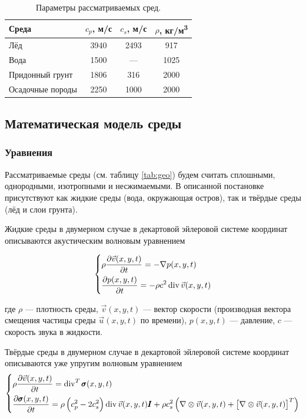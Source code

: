 \renewcommand{\arraystretch}{1.2}
\begin{table}[htb]
\centering
    \begin{tabular}{|l|c|c|c|}
    \hline
    Среда & $c_p$, м/с & $c_s$, м/с & $\rho$, кг/м\textsuperscript{3} \\ \hline
    Лёд & 3940 & 2493 & 917 \\ \hline
    Вода & 1500  & --- & 1025 \\ \hline
    Придонный грунт & 1806 & 316 & 2000 \\ \hline
    Осадочные породы & 2250 & 1000 & 2000 \\ \hline
    \end{tabular}
\caption{Параметры рассматриваемых сред.}
\label{tab:geo}
\end{table}
\renewcommand{\arraystretch}{1.0}

\subsection{Математическая модель среды}

\subsubsection{Уравнения}

Рассматриваемые среды (см. таблицу \autoref{tab:geo}) будем считать сплошными, однородными, изотропными и несжимаемыми. В описанной постановке присутствуют как жидкие среды (вода, окружающая остров), так и твёрдые среды (лёд и слои грунта).

Жидкие среды в двумерном случае в декартовой эйлеровой системе координат описываются акустическим волновым уравнением

\begin{equation}
    \begin{dcases}
        \rho \frac{\partial \vec{v}(x,y,t)}{\partial t} = -\nabla p (x,y,t) \\
        \frac{\partial p(x,y,t)}{\partial t} = -\rho c^2 \operatorname{div} \vec{v}(x,y,t)
    \end{dcases}
    \label{eq:acoustic_wave_eq}
\end{equation}

где $\rho$ --- плотность среды, $\vec{v}(x,y,t)$ --- вектор скорости (производная вектора смещения частицы среды $\vec{u}(x,y,t)$ по времени), $p(x,y,t)$ --- давление, $c$ --- скорость звука в жидкости.

Твёрдые среды в двумерном случае в декартовой эйлеровой системе координат описываются уже  упругим волновым уравнением
\begin{equation}
    \begin{dcases}
        \rho \frac{\partial \vec{v}(x,y,t)}{\partial t} = \operatorname{div}^T \pmb{\sigma} (x,y,t) \\
        \frac{\partial \pmb{\sigma}(x,y,t)}{\partial t} = \rho \left(c_p^2 - 2c_s^2\right) \operatorname{div} \vec{v}(x,y,t) \pmb{I} + \rho c_s^2 \left(\nabla \otimes \vec{v}(x,y,t) + \left[ \nabla \otimes \vec{v}(x,y,t)\right]^T \right)
    \end{dcases}
    \label{eq:elastic_wave_eq}
\end{equation}


